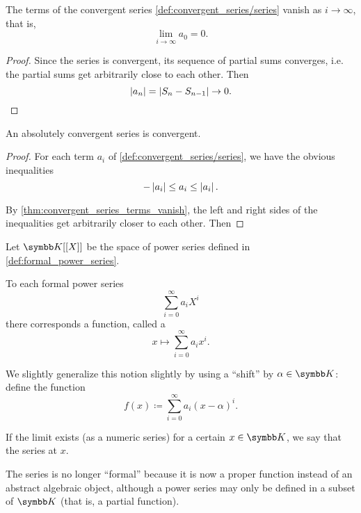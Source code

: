 \begin{proposition}\label{thm:convergent_series_terms_vanish}
  The terms of the convergent series \cref{def:convergent_series/series} vanish as \( i \to \infty \), that is,
  \begin{equation*}
    \lim_{i \to \infty} a_0 = 0.
  \end{equation*}
\end{proposition}
\begin{proof}
  Since the series is convergent, its sequence of partial sums converges, i.e. the partial sums get arbitrarily close to each other. Then
  \begin{equation*}
    \left\vert a_n \right\vert = \left\vert S_n - S_{n-1} \right\vert \to 0.
  \end{equation*}
\end{proof}

\begin{proposition}\label{thm:absolutely_convergent_series_is_convergent}
  An absolutely convergent series is convergent.
\end{proposition}
\begin{proof}
  For each term \( a_i \) of \cref{def:convergent_series/series}, we have the obvious inequalities
  \begin{equation*}
    -\left\vert a_i \right\vert \leq a_i \leq \left\vert a_i \right\vert.
  \end{equation*}

  By \cref{thm:convergent_series_terms_vanish}, the left and right sides of the inequalities get arbitrarily closer to each other. Then
\end{proof}

\begin{definition}\label{def:convergent_power_series}
  Let \( \K[[X]] \) be the space of power series defined in \cref{def:formal_power_series}.

  To each formal power series
  \begin{equation*}
    \sum_{i=0}^\infty a_i X^i
  \end{equation*}
  there corresponds a function, called a 
  \begin{equation*}
    x \mapsto \sum_{i=0}^\infty a_i x^i.
  \end{equation*}

  We slightly generalize this notion slightly by using a \enquote{shift} by \( \alpha \in \K \): define the function
  \begin{equation}\label{def:convergent_power_series/series}
    f(x) \coloneqq \sum_{i=0}^\infty a_i (x - \alpha)^i.
  \end{equation}

  If the limit exists (as a numeric series) for a certain \( x \in \K \), we say that the series  at \( x \).

  The series is no longer \enquote{formal} because it is now a proper function instead of an abstract algebraic object, although a power series may only be defined in a subset of \( \K \) (that is, a partial function).
\end{definition}

